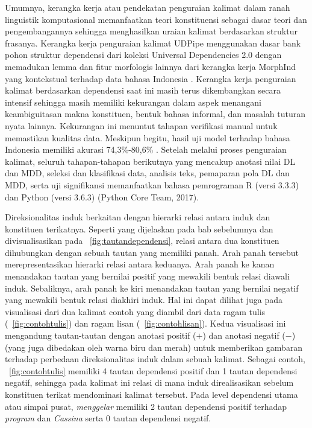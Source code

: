 \documentclass[10pt, a4paper, conference, compsocconf]{IEEEtran}
\begin{document}
Umumnya, kerangka kerja atau pendekatan penguraian kalimat dalam ranah linguistik komputasional memanfaatkan teori konstituensi sebagai dasar teori dan pengembangannya sehingga menghasilkan uraian kalimat berdasarkan struktur frasanya. Kerangka kerja penguraian kalimat UDPipe menggunakan dasar bank pohon struktur dependensi dari koleksi Universal Dependencies 2.0 \citep{nivre2017universal} dengan memadukan lemma dan fitur morfologis lainnya dari kerangka kerja MorphInd yang kontekstual terhadap data bahasa Indonesia \citep{larasati2011indonesian}. Kerangka kerja penguraian kalimat berdasarkan dependensi saat ini masih terus dikembangkan secara intensif sehingga masih memiliki kekurangan dalam aspek menangani keambiguitasan makna konstituen, bentuk bahasa informal, dan masalah tuturan nyata lainnya. Kekurangan ini menuntut tahapan verifikasi manual untuk memastikan kualitas data. Meskipun begitu, hasil uji model terhadap bahasa Indonesia memiliki akurasi 74,3\%-80,6\% \citep{udpipe2017}. Setelah melalui proses penguraian kalimat, seluruh tahapan-tahapan berikutnya yang mencakup anotasi nilai DL dan MDD, seleksi dan klasifikasi data, analisis teks, pemaparan pola DL dan MDD, serta uji signifikansi memanfaatkan bahasa pemrograman R (versi 3.3.3) \citep{r2017project} dan Python (versi 3.6.3) (Python Core Team, 2017).

Direksionalitas induk berkaitan dengan hierarki relasi antara induk dan konstituen terikatnya. Seperti yang dijelaskan pada bab sebelumnya dan divisualisasikan pada \pic~\ref{fig:tautandependensi}, relasi antara dua konstituen dihubungkan dengan sebuah tautan yang memiliki panah. Arah panah tersebut merepresentasikan hierarki relasi antara keduanya. Arah panah ke kanan menandakan tautan yang bernilai positif yang mewakili bentuk relasi diawali induk. Sebaliknya, arah panah ke kiri menandakan tautan yang bernilai negatif yang mewakili bentuk relasi diakhiri induk. Hal ini dapat dilihat juga pada visualisasi dari dua kalimat contoh yang diambil dari data ragam tulis (\pic~\ref{fig:contohtulis}) dan ragam lisan (\pic~\ref{fig:contohlisan}). Kedua visualisasi ini mengandung tautan-tautan dengan anotasi positif ($+$) dan anotasi negatif ($-$) (yang juga dibedakan oleh warna biru dan merah) untuk memberikan gambaran terhadap perbedaan direksionalitas induk dalam sebuah kalimat. Sebagai contoh, \pic~\ref{fig:contohtulis} memiliki 4 tautan dependensi positif dan 1 tautan dependensi negatif, sehingga pada kalimat ini relasi di mana induk direalisasikan sebelum konstituen terikat mendominasi kalimat tersebut. Pada level dependensi utama atau simpai pusat, \textit{menggelar} memiliki 2 tautan dependensi positif terhadap \textit{program} dan \textit{Cassina} serta 0 tautan dependensi negatif.
\end{document}
